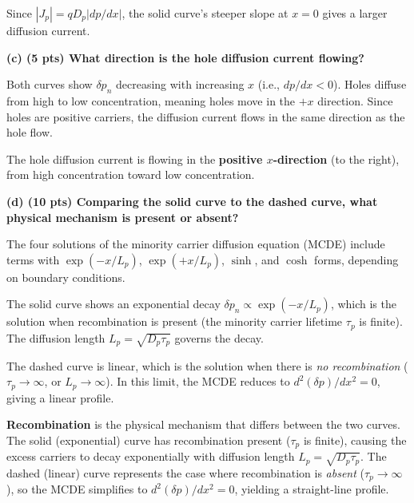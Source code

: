 \documentclass[11pt]{article}
\begin{document}
\begin{answerbox}
  Since $|J_p| = qD_p |dp/dx|$, the solid curve's steeper slope at $x=0$ gives a larger diffusion current.
\end{answerbox}

\textbf{(c) (5 pts) What direction is the hole diffusion current flowing?}

Both curves show $\delta p_n$ decreasing with increasing $x$ (i.e., $dp/dx < 0$). Holes diffuse from high to low concentration, meaning holes move in the $+x$ direction. Since holes are positive carriers, the diffusion current flows in the same direction as the hole flow.

\begin{answerbox}
  The hole diffusion current is flowing in the \textbf{positive $x$-direction} (to the right), from high concentration toward low concentration.
\end{answerbox}

\textbf{(d) (10 pts) Comparing the solid curve to the dashed curve, what physical mechanism is present or absent?}

The four solutions of the minority carrier diffusion equation (MCDE) include terms with $\exp(-x/L_p)$, $\exp(+x/L_p)$, $\sinh$, and $\cosh$ forms, depending on boundary conditions.

The solid curve shows an exponential decay $\delta p_n \propto \exp(-x/L_p)$, which is the solution when recombination is present (the minority carrier lifetime $\tau_p$ is finite). The diffusion length $L_p = \sqrt{D_p \tau_p}$ governs the decay.

The dashed curve is linear, which is the solution when there is \emph{no recombination} ($\tau_p \to \infty$, or $L_p \to \infty$). In this limit, the MCDE reduces to $d^2(\delta p)/dx^2 = 0$, giving a linear profile.

\begin{answerbox}
  \textbf{Recombination} is the physical mechanism that differs between the two curves. The solid (exponential) curve has recombination present ($\tau_p$ is finite), causing the excess carriers to decay exponentially with diffusion length $L_p = \sqrt{D_p \tau_p}$. The dashed (linear) curve represents the case where recombination is \emph{absent} ($\tau_p \to \infty$), so the MCDE simplifies to $d^2(\delta p)/dx^2 = 0$, yielding a straight-line profile.
\end{answerbox}

\newpage

\end{document}

